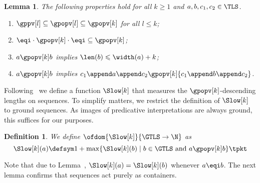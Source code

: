 \documentclass{LMCS}
\newtheorem{definition}[thm]{Definition}
\newtheorem{lemma}[thm]{Lemma}
\begin{document}
\begin{lemma}\label{l:approx}
  The following properties hold for all $k \geqslant 1$ and $a,b,c_1,c_2 \in \TLS$.
  \begin{enumerate}[labelsep=*,leftmargin=*]
  \item\label{l:approx:kmon} ${\gppv[l]} \subseteq {\gpopv[l]} \subseteq {\gpopv[k]}$ for all $l \leqslant k$;
  \item\label{l:approx:modeqi} ${\eqi} \cdot {\gpopv[k]} \cdot {\eqi} \subseteq {\gpopv[k]}$;
  \item\label{l:approx:bound} $a \gpopv[k] b$ implies $\len(b) \leqslant \width(a) + k$;
  \item\label{l:approx:subseq} $a \gpopv[k] b$ implies ${c_1 \append a \append c_2} \gpopv[k] {c_1 \append b \append c_2}$.
  \end{enumerate}
\end{lemma}




Following~\cite{AM05} we define a function $\Slow[k]$ that measures the 
$\gpopv[k]$-descending lengths on sequences. To simplify matters, 
we restrict the definition of $\Slow[k]$ to ground sequences.
As images of predicative interpretations are always ground, this suffices for our purposes.
\begin{definition}
We define $\ofdom{\Slow[k]}{\GTLS \to \N}$
as
\begin{equation*}
  \Slow[k](a) \defsym 1 + \max
 \{ \Slow[k](b) \mid b \in \GTLS \text{ and } a \gpopv[k] b
 \}\tpkt
\end{equation*}
\end{definition}

Note that due to Lemma~, $\Slow[k](a) = \Slow[k](b)$
whenever $a \eqi b$. The next lemma confirms that sequences act purely as containers.
\end{document}

